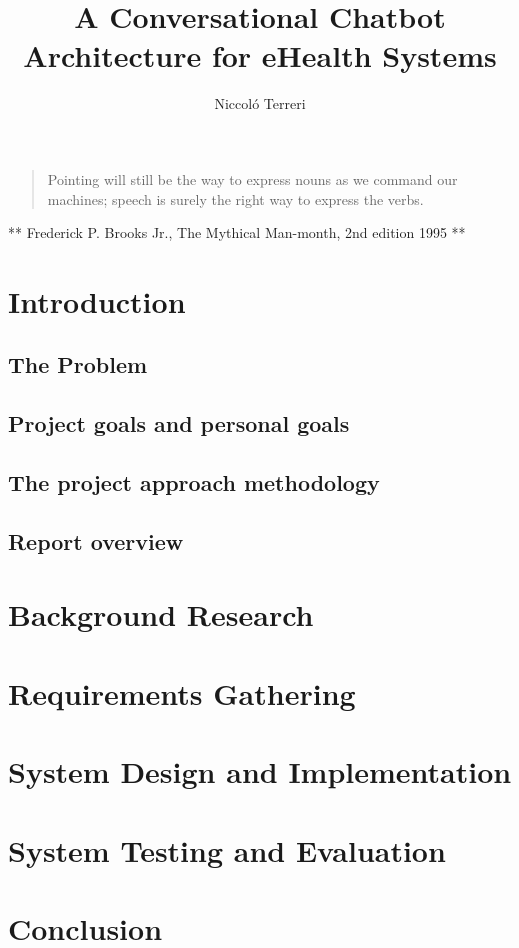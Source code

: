 \documentclass[12pt,A4paper,twoside]{report}
\title{A Conversational Chatbot Architecture for eHealth Systems}
\author{Niccoló Terreri}
\date{}
\begin{document}
\maketitle

{
\setcounter{tocdepth}{2}
\tableofcontents
}
\begin{quote}
Pointing will still be the way to express nouns as we command our
machines; speech is surely the right way to express the verbs.
\end{quote}

** Frederick P. Brooks Jr., The Mythical Man-month, 2nd edition 1995 **

\chapter{Introduction}\label{introduction}

\section{The Problem}\label{the-problem}

\section{Project goals and personal
goals}\label{project-goals-and-personal-goals}

\section{The project approach
methodology}\label{the-project-approach-methodology}

\section{Report overview}\label{report-overview}

\chapter{Background Research}\label{background-research}

\chapter{Requirements Gathering}\label{requirements-gathering}

\chapter{System Design and
Implementation}\label{system-design-and-implementation}

\chapter{System Testing and
Evaluation}\label{system-testing-and-evaluation}

\chapter{Conclusion}\label{conclusion}
\end{document}
